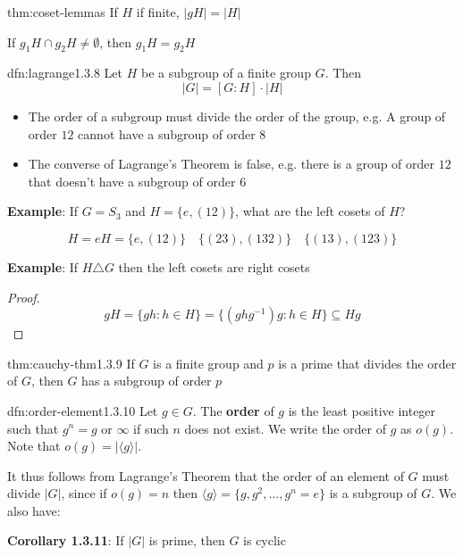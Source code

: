 \documentclass{article}
\begin{document}
\begin{thm}{thm:coset-lemmas}{}
    If $H$ if finite, $\lvert gH \rvert = \lvert H \rvert$

    If $g_{1}H \cap g_{2}H \ne \emptyset$, then $g_{1}H = g_{2}H$
\end{thm}

\begin{thm}{dfn:lagrange}{1.3.8}
    Let $H$ be a subgroup of a finite group $G$. Then
    \[\lvert G \rvert = [G : H] \cdot \lvert H \rvert\]

    \begin{itemize}
        \item The order of a subgroup must divide the order of the group, e.g. A group of order $12$ cannot have a subgroup of order $8$
        \item The converse of Lagrange's Theorem is false, e.g. there is a group of order $12$ that doesn't have a subgroup of order $6$
    \end{itemize}
\end{thm}

\textbf{Example}: If $G = S_{3}$ and $H = \{e, (12)\}$, what are the left cosets of $H$?

\[H = eH = \{e, (12)\} \quad \{(23), (132)\} \quad \{(13), (123)\}\] 

\textbf{Example}: If $H \triangle G$ then the left cosets are right cosets

\begin{proof}
    \[gH = \{gh : h\in H\} = \{(ghg^{-1})g : h\in H\} \subseteq Hg\]
\end{proof}

\begin{thm}{thm:cauchy-thm}{1.3.9}
    If $G$ is a finite group and $p$ is a prime that divides the order of $G$, then $G$ has a subgroup of order $p$
\end{thm}

\begin{dfn}{dfn:order-element}{1.3.10}
    Let $g\in G$. The \textbf{order} of $g$ is the least positive integer such that $g^{n} = g$ or $\infty$ if such $n$ does not exist. We write the order of $g$ as $o(g)$. Note that $o(g) = \lvert \langle g \rangle \rvert$.

    It thus follows from Lagrange's Theorem that the order of an element of $G$ must divide $\lvert G \rvert$, since if $o(g) = n$ then $\langle g \rangle = \{g, g^{2},\dots, g^{n} = e\}$ is a subgroup of $G$. We also have:

    \longrule{0.08ex}

    \textbf{Corollary 1.3.11}: If $\lvert G \rvert$ is prime, then $G$ is cyclic
\end{dfn}
\end{document}
